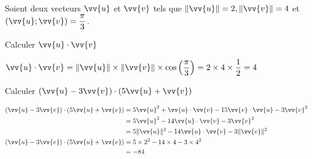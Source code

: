 \documentclass[12pt,a4paper]{article}  %
\begin{document}
\exerciceDS{ - ( \textcolor{red}{3 points} )}
Soient deux vecteurs $\vv{u}$ et $\vv{v}$ tels que $\|\vv{u}\|=2,\|\vv{v}\|=4$ et $(\vv{u} ; \vv{v})=\dfrac{\pi}{3}$.
\begin{enumMet}
	\item Calculer $\vv{u}\cdot\vv{v}$\quad {}\\
	\begin{corrBox}
		$\vv{u} \cdot \vv{v}=\|\vv{u}\| \times \|\vv{v}\| \times \cos \left(\dfrac{\pi}{3}\right)=2 \times 4 \times \dfrac{1}{2}=4$
	\end{corrBox}
	\item Calculer $(\vv{u}-3 \vv{v}) \cdot(5 \vv{u}+\vv{v})$ \quad {}
	\begin{corrBox}
		$\begin{aligned}
			(\vv{u}-3 \vv{v}) \cdot(5 \vv{u}+\vv{v}) &=5 \vv{u}^{2}+\vv{u} \cdot \vv{v}-15 \vv{v} \cdot \vv{u}-3 \vv{v}^{2} \\
			&=5 \vv{u}^{2}-14 \vv{u} \cdot \vv{v}-3 \vv{v}^{2} \\
			&=5\|\vv{u}\|^{2}-14 \vv{u} \cdot \vv{v}-3\|\vv{v}\|^{2} \\
			(\vv{u}-3 \vv{v}) \cdot(5 \vv{u}+\vv{v}) &=5 \times 2^2-14 \times 4-3 \times 4^2 \\
			&=-84
		\end{aligned}$
	\end{corrBox}
\end{enumMet}



\end{document}

